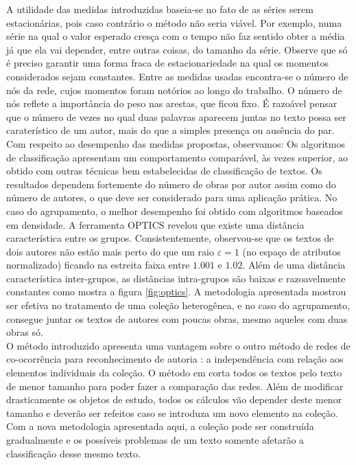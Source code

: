 \documentclass[a4paper,openright,12pt]{report} %
\begin{document}
A utilidade das medidas introduzidas baseia-se no fato de as s\'eries serem estacion\'arias, pois caso contr\'ario o m\'etodo n\~ao seria vi\'avel. Por exemplo, numa s\'erie na qual o valor esperado cres\c ca com o tempo n\~ao faz sentido obter a m\'edia j\'a que ela vai depender, entre outras coisas, do tamanho da s\'erie. Observe que s\'o \'e preciso garantir uma forma fraca de estacionariedade na qual os momentos considerados sejam constantes. Entre as medidas usadas encontra-se o n\'umero de n\'os da rede, cujos momentos foram not\'orios ao longo do trabalho. O n\'umero de n\'os reflete a import\^ancia do peso nas arestas, que ficou fixo. \'E razo\'avel pensar que o n\'umero de vezes no qual duas palavras aparecem juntas no texto possa ser carater\'istico de um autor, mais do que a simples presen\c ca ou aus\^encia do par.\\

Com respeito ao desempenho das medidas propostas, observamos: Os algoritmos de classifica\c c\~ao apresentam um comportamento compar\'avel, \`as vezes superior, ao obtido com outras t\'ecnicas bem estabelecidas de classifica\c c\~ao de textos. Os resultados dependem fortemente do n\'umero de obras por autor assim como do n\'umero de autores, o que deve ser considerado para uma aplica\c c\~ao pr\'atica. No caso do agrupamento, o melhor desempenho foi obtido com algoritmos baseados em densidade. A ferramenta OPTICS revelou que existe uma dist\^ancia caracter\'istica entre os grupos. Consistentemente, observou-se que os textos de dois autores n\~ao est\~ao mais perto do que um raio $\varepsilon=1$ (no espa\c co de atributos normalizado) ficando na estreita faixa entre $1.001$ e $1.02$. Al\'em de uma dist\^ancia caracter\'istica inter-grupos, as dist\^ancias intra-grupos s\~ao baixas e razoavelmente constantes como mostra a figura \ref{fig:optics}. A metodologia apresentada mostrou ser efetiva no tratamento de uma cole\c c\~ao heterog\^enea, e no caso do agrupamento, consegue juntar os textos de autores com poucas obras, mesmo aqueles com duas obras s\'o.\\

O m\'etodo introduzido apresenta uma vantagem sobre o outro m\'etodo de redes de co-ocorr\^encia para reconhecimento de autoria \cite{amancio2011comparing}: a independ\^encia com rela\c c\~ao aos elementos individuais da cole\c c\~ao. O m\'etodo em \cite{amancio2011comparing} corta todos os textos pelo texto de menor tamanho para poder fazer a compara\c c\~ao das redes. Al\'em de modificar drasticamente os objetos de estudo, todos os c\'alculos v\~ao depender deste menor tamanho e dever\~ao ser refeitos caso se introduza um novo elemento na cole\c c\~ao. Com a nova metodologia apresentada aqui, a cole\c c\~ao pode ser constru\'ida gradualmente e os poss\'iveis problemas de um texto somente afetar\~ao a classifica\c c\~ao desse mesmo texto.\\
\end{document}
